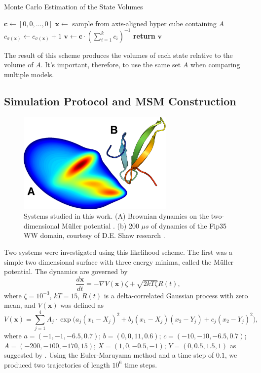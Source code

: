 \documentclass[journal=jpcbfk, layout=traditional, manuscript=article]{achemso}
\begin{document}
\begin{algorithm}
\caption{Monte Carlo Estimation of the State Volumes}
\label{alg:volumes}
\begin{algorithmic}[1]
	\State $\mathbf{c} \gets [0, 0, \ldots, 0]$
		\State $\mathbf{x} \gets $ sample from axis-aligned hyper cube containing $A$
			\State $c_{\sigma(\mathbf{x})} \gets c_{\sigma(\mathbf{x})} + 1$
		\EndIf
	\EndWhile
	\State $\mathbf{v} \gets \mathbf{c} \cdot(\sum_{i=1}^k c_i)^{-1}$ 
	\State \textbf{return} $\mathbf{v}$
\EndProcedure
\end{algorithmic}
\end{algorithm} \noindent The result of this scheme produces the volumes of each state relative to the volume of $A$. It's important, therefore, to use the same set $A$ when comparing multiple models.
\subsection{Simulation Protocol and MSM Construction}

\begin{figure}
\centering
\includegraphics[width=3in]{figs_final/mull_ww.png}
\caption{Systems studied in this work. (A) Brownian dynamics on the two-dimensional M\"{u}ller potential \cite{Muller1979Location}. (b) 200 $\mu s$ of dynamics of the Fip35 WW domain\cite{Liu2008Experimental}, courtesy of D.E. Shaw research \cite{Shaw2010Atomic}.}
\label{fig:pics}
\end{figure} 

Two systems were investigated using this likelihood scheme. The first was a simple two dimensional surface with three energy minima, called the M\"{u}ller potential. The dynamics are governed by
$$
\frac{d\mathbf{x}}{dt} = - \nabla V(\mathbf{x})\zeta + \sqrt{2kT\zeta} R(t),
$$ where $\zeta = 10^{-3}$, $kT = 15$, $R(t)$ is a delta-correlated Gaussian process with zero mean, and $V(\mathbf{x})$ was defined as
$$
V(\mathbf{x}) =  \sum_{j=1}^4 A_j \cdot \exp\Big(a_j (x_1-X_j)^2+b_j(x_1-X_j)(x_2-Y_j)+c_j(x_2-Y_j)^2\Big),
$$ where $a = (-1, -1, -6.5, 0.7)$; $b = (0, 0, 11, 0.6)$; $c = (-10, -10, -6.5, 0.7)$; $A = (-200, -100, -170, 15)$; $X = (1, 0, -0.5, -1)$; $Y = (0, 0.5, 1.5, 1)$ as suggested by \citet{Muller1979Location}. Using the Euler-Maruyama method and a time step of $0.1$, we produced two trajectories of length $10^6$ time steps.
\end{document}
